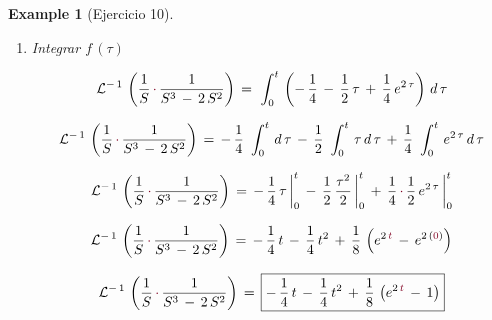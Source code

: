 \documentclass[a4paper,11pt,openany]{book}
\newtheorem{exmp}{Example}[section]
\newcommand*{\itembolasazules}[1]{%
\footnotesize\protect\tikz[baseline=-3pt]%
\protect\node[scale=.7, circle, shade, ball
color=green]{\color{white}\Large\bf#1};}
\begin{document}
\begin{exmp}[Ejercicio 10]
\begin{enumerate}[label=\itembolasazules{\arabic*}]
\textcolor{burgundy}{}\, $$\dfrac{1}{S^{3}\,-\,2\,S^{2}}\,=\,-\,\dfrac{1}{4}\,\textcolor{burgundy}{\cdot}\,\dfrac{1}{S}\,-\,\dfrac{1}{2}\,\textcolor{burgundy}{\cdot}\,\dfrac{1}{S^{2}}\,+\,\dfrac{1}{4}\,\textcolor{burgundy}{\cdot}\,\dfrac{1}{S\,-\,2}$$
 
$$\mathcal{L}^{-\,1}\,\left(\dfrac{1}{S^{3}\,-\,2\,S^{2}} \right)\,=\,-\,\dfrac{1}{4}\,\mathcal{L}^{-\,1}\,\left(\dfrac{1}{S} \right)\,-\,\dfrac{1}{2}\, \mathcal{L}^{-\,1}\,\left(\dfrac{1}{S^{2}} \right)\,+\,\dfrac{1}{4}\,\mathcal{L}^{-\,1}\,\left(\dfrac{1}{S\,-\,2} \right)$$
 
$$\mathcal{L}^{-\,1}\,\left(\dfrac{1}{S^{3}\,-\,2\,S^{2}} \right)\,=\,\underbrace{-\,\dfrac{1}{4}\,-\,\dfrac{1}{2}\,\tau\,+\,\dfrac{1}{4}\,e^{2\,\tau}}_{\textcolor{burgundy}{f\,(\tau) } }$$
 
\item Integrar $f\,(\tau)$
 
$$\mathcal{L}^{-\,1}\,\left(\dfrac{1}{S}\,\textcolor{burgundy}{\cdot}\,\dfrac{1}{S^{3}\,-\,2\,S^{2}} \right)\,=\,\displaystyle\,\int_{0}^{t}\,\left(-\,\dfrac{1}{4}\,-\,\dfrac{1}{2}\,\tau\,+\,\dfrac{1}{4}\,e^{2\,\tau} \right)\,d\,\tau$$  
 
$$\mathcal{L}^{-\,1}\,\left(\dfrac{1}{S}\,\textcolor{burgundy}{\cdot}\,\dfrac{1}{S^{3}\,-\,2\,S^{2}} \right)\,=\,-\,\dfrac{1}{4}\,\displaystyle\,\int_{0}^{t}\,d\,\tau\,-\,\dfrac{1}{2}\,\displaystyle\,\int_{0}^{t}\,\tau\,d\,\tau\,+\,\dfrac{1}{4}\,\displaystyle\,\int_{0}^{t}\,e^{2\,\tau}\,d\,\tau$$ 
 
$$\mathcal{L}^{-\,1}\,\left(\dfrac{1}{S}\,\textcolor{burgundy}{\cdot}\,\dfrac{1}{S^{3}\,-\,2\,S^{2}} \right)\,=\,-\,\dfrac{1}{4}\,\tau\,\biggr|_{0}^{t}\,-\,\dfrac{1}{2}\,\dfrac{\tau^{2}}{2}\,\biggr|_{0}^{t}\,+\,\dfrac{1}{4}\,\textcolor{burgundy}{\cdot}\,\dfrac{1}{2}\,e^{2\,\tau}\,\biggr|_{0}^{t}$$
 
$$\mathcal{L}^{-\,1}\,\left(\dfrac{1}{S}\,\textcolor{burgundy}{\cdot}\,\dfrac{1}{S^{3}\,-\,2\,S^{2}} \right)\,=\,-\,\dfrac{1}{4}\,t\,-\,\dfrac{1}{4}\,t^{2}\,+\,\dfrac{1}{8}\,\left(e^{2\,\textcolor{burgundy}{t}}\,-\,e^{2\,(\textcolor{burgundy}{0})}  \right)$$
 
$$\mathcal{L}^{-\,1}\,\left(\dfrac{1}{S}\,\textcolor{burgundy}{\cdot}\,\dfrac{1}{S^{3}\,-\,2\,S^{2}} \right)\,=\,\boxed{-\,\dfrac{1}{4}\,t\,-\,\dfrac{1}{4}\,t^{2}\,+\,\dfrac{1}{8}\,\left(e^{2\,\textcolor{burgundy}{t}}\,-\,1  \right)}$$
 
\end{enumerate}

\end{exmp}
 
\end{document}

